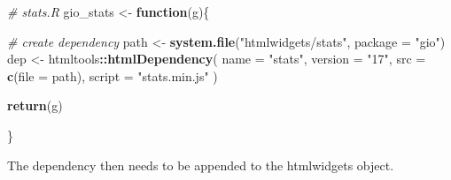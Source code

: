 \documentclass[
]{krantz}
\makeatletter
\newenvironment{Shaded}{\begin{snugshade}}{\end{snugshade}}
\newcommand{\CommentTok}[1]{\textcolor[rgb]{0.37,0.37,0.37}{\textit{#1}}}
\newcommand{\ControlFlowTok}[1]{\textcolor[rgb]{0.27,0.27,0.27}{\textbf{#1}}}
\newcommand{\DataTypeTok}[1]{\textcolor[rgb]{0.27,0.27,0.27}{#1}}
\newcommand{\KeywordTok}[1]{\textcolor[rgb]{0.27,0.27,0.27}{\textbf{#1}}}
\newcommand{\NormalTok}[1]{#1}
\newcommand{\OperatorTok}[1]{\textcolor[rgb]{0.43,0.43,0.43}{\textbf{#1}}}
\newcommand{\StringTok}[1]{\textcolor[rgb]{0.5,0.5,0.5}{#1}}
\newenvironment{kframe}{%
\medskip{}
\setlength{\fboxsep}{.8em}
 \def\at@end@of@kframe{}%
 \ifinner\ifhmode%
  \def\at@end@of@kframe{\end{minipage}}%
  \begin{minipage}{\columnwidth}%
 \fi\fi%
 \def\FrameCommand##1{\hskip\@totalleftmargin \hskip-\fboxsep
 \colorbox{shadecolor}{##1}\hskip-\fboxsep
     \hskip-\linewidth \hskip-\@totalleftmargin \hskip\columnwidth}%
 \MakeFramed {\advance\hsize-\width
   \@totalleftmargin\z@ \linewidth\hsize
   \@setminipage}}%
 {\par\unskip\endMakeFramed%
 \at@end@of@kframe}
\renewenvironment{Shaded}{\begin{kframe}}{\end{kframe}}
\makeatother
\begin{document}
\begin{Shaded}
\begin{Highlighting}[]
\CommentTok{\# stats.R}
\NormalTok{gio\_stats \textless{}{-}}\StringTok{ }\ControlFlowTok{function}\NormalTok{(g)\{}

  \CommentTok{\# create dependency}
\NormalTok{  path \textless{}{-}}\StringTok{ }\KeywordTok{system.file}\NormalTok{(}\StringTok{"htmlwidgets/stats"}\NormalTok{, }\DataTypeTok{package =} \StringTok{"gio"}\NormalTok{)}
\NormalTok{  dep \textless{}{-}}\StringTok{ }\NormalTok{htmltools}\OperatorTok{::}\KeywordTok{htmlDependency}\NormalTok{(}
    \DataTypeTok{name =} \StringTok{"stats"}\NormalTok{,}
    \DataTypeTok{version =} \StringTok{"17"}\NormalTok{,}
    \DataTypeTok{src =} \KeywordTok{c}\NormalTok{(}\DataTypeTok{file =}\NormalTok{ path),}
    \DataTypeTok{script =} \StringTok{"stats.min.js"}
\NormalTok{  )}

  \KeywordTok{return}\NormalTok{(g)}

\NormalTok{\}}
\end{Highlighting}
\end{Shaded}

The dependency then needs to be appended to the htmlwidgets object.

\begin{Shaded}
\end{Shaded}
\end{document}
